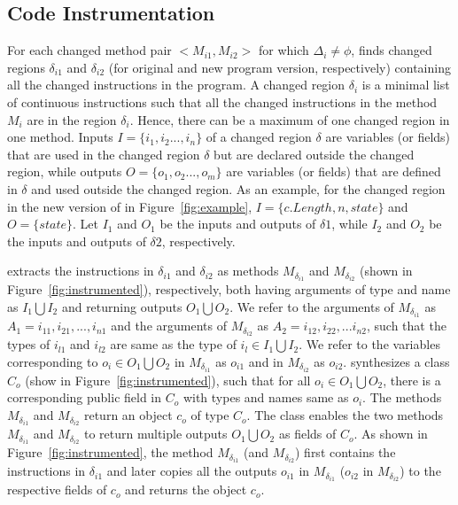 \subsection{Code Instrumentation}
\vspace{-2ex}
For each changed method pair $<$$M_{i1}, M_{i2}$$>$ for which $\Delta_i \neq \phi$,  finds changed regions $\delta_{i1}$ and $\delta_{i2}$ (for original and new program version, respectively) 
containing all the changed instructions in the program. 
A changed region $\delta_i$ is a minimal list of continuous instructions 
such that all the changed instructions in the method $M_i$ are in the 
region $\delta_i$. Hence, there can be a maximum of one changed region in one method.
Inputs $I = \{i_1, i_2...,i_n\}$ of a changed region $\delta$ are variables (or fields) that are used 
in the changed region $\delta$ but are declared outside the changed region, 
while outputs $O = \{o_1, o_2...,o_m\}$ are variables (or fields) 
that are defined in $\delta$ and used outside the changed region.
As an example, for the changed region in the new version of  in Figure~\ref{fig:example}, $I = \{c.Length, n, state\}$ and $O = \{state\}$.
Let $I_1$ and $O_1$ be the inputs and outputs of $\delta1$, while $I_2$ and $O_2$ be 
the inputs and outputs of $\delta2$, respectively.

 extracts the instructions in $\delta_{i1}$ and $\delta_{i2}$ as methods $M_{\delta_{i1}}$ and 
$M_{\delta_{i2}}$ (shown in Figure~\ref{fig:instrumented}), respectively, both having arguments of type and name as $I_1 \bigcup I_2$ and returning outputs 
$O_1 \bigcup O_2$.
We refer to the arguments of $M_{\delta_{i1}}$ as $A_{1} = {i_{11}, i_{21},...,i_{n1}}$ and the arguments of 
$M_{\delta_{i2}}$ as $A_{2} = {i_{12}, i_{22},...i_{n2}}$, such that the types of $i_{l1}$ and $i_{l2}$
are same as the type of $i_l \in I_1 \bigcup I_2$.
We refer to the variables corresponding to $o_i \in O_1 \bigcup O_2$ in $M_{\delta_{i1}}$ as $o_{i1}$ and in 
$M_{\delta_{i2}}$ as $o_{i2}$.
 synthesizes a class $C_o$ (show in Figure~\ref{fig:instrumented}), such that 
for all $o_i \in O_1 \bigcup O_2$, there is a corresponding public field in $C_o$ with 
types and names same as $o_i$.
The methods $M_{\delta_{i1}}$ and $M_{\delta_{i2}}$ return an object $c_o$ of type $C_o$.
The class enables the two methods $M_{\delta_{i1}}$ and $M_{\delta_{i2}}$
to return multiple outputs $O_1 \bigcup O_2$ as fields of $C_o$.
As shown in Figure~\ref{fig:instrumented}, the method $M_{\delta_{i1}}$ (and $M_{\delta_{i2}}$)
first contains the instructions in $\delta_{i1}$ and later copies all the outputs 
$o_{i1}$ in $M_{\delta_{i1}}$ ($o_{i2}$ in $M_{\delta_{i2}}$) to the respective fields 
of $c_o$ and returns the object $c_o$.


